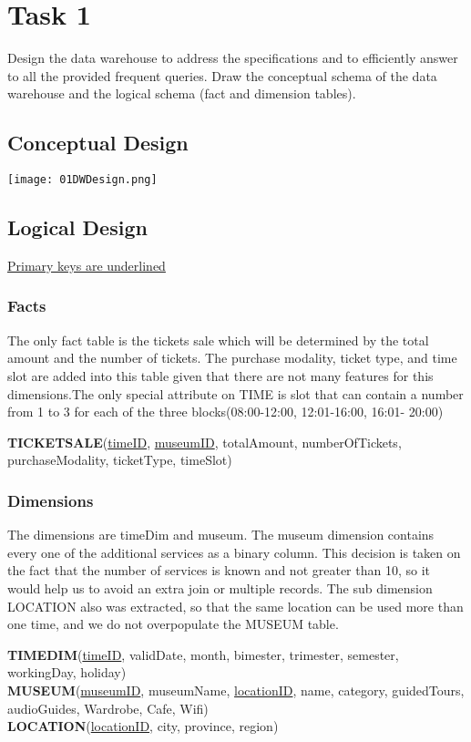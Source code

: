 \section{Task 1}

\begin{question}
    Design the data warehouse to address the specifications and to efficiently answer to all
    the provided frequent queries.
    Draw the conceptual schema of the data warehouse and the logical schema (fact and dimension tables).
\end{question}
\begin{answer}
    \subsection{Conceptual Design}
    \begin{center}
        \texttt{[image: 01DWDesign.png]}
    \end{center}
    \subsection{Logical Design}
    \underline{Primary keys are underlined}
    \subsubsection{Facts}
    The only fact table is the tickets sale which will be determined by the total amount and the number of tickets.
    The purchase modality, ticket type, and time slot are added into this table given that there are not many features
    for this dimensions.The only special attribute on TIME is slot that can contain a number from 1 to 3
    for each of the three blocks(08:00-12:00, 12:01-16:00, 16:01- 20:00)
    \par
    \textbf{TICKETSALE}(\underline{timeID}, \underline{museumID}, totalAmount, numberOfTickets, purchaseModality, ticketType,
        timeSlot)
    \subsubsection{Dimensions}
    The dimensions are timeDim and museum. The museum dimension contains every one of the additional services as a binary
    column. This decision is taken on the fact that the number of services is known and not greater than 10, so it would
    help us to avoid an extra join or multiple records. The sub dimension LOCATION also was extracted, so that the same
    location can be used more than one time, and we do not overpopulate the MUSEUM table.
    \par
    \textbf{TIMEDIM}(\underline{timeID}, validDate, month, bimester, trimester, semester, workingDay, holiday) \\
    \textbf{MUSEUM}(\underline{museumID}, museumName, \underline{locationID}, name, category, guidedTours, audioGuides, Wardrobe, Cafe,
    Wifi) \\
    \textbf{LOCATION}(\underline{locationID}, city, province, region) \\
\end{answer}

